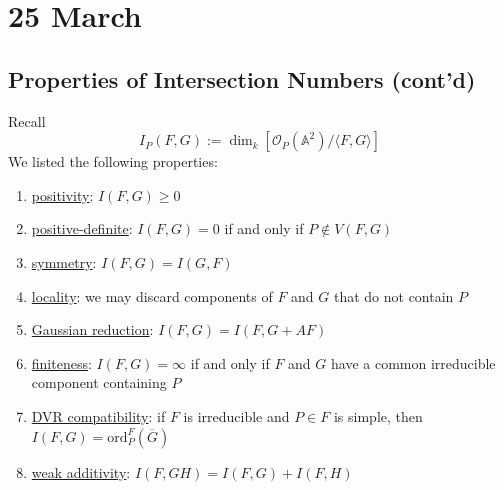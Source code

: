 \documentclass[12pt]{article}
\newcommand{\vbrack}[1]{\langle #1\rangle}
\theoremstyle{definition}
\begin{document}
\section{25 March}
\subsection{Properties of Intersection Numbers (cont'd)}
Recall 
\[I_P(F,G):=\dim_k\left[\mathcal{O}_P(\mathbb{A}^2)/\vbrack{F,G}\right]\]
We listed the following properties:
\begin{enumerate}
    \item \underline{positivity}: $I(F,G)\geq0$
    \item \underline{positive-definite}: $I(F,G)=0$ if and only if $P\notin V(F,G)$
    \item \underline{symmetry}: $I(F,G)=I(G,F)$
    \item \underline{locality}: we may discard components of $F$ and $G$ that do not contain $P$
    \item \underline{Gaussian reduction}: $I(F,G)=I(F,G+AF)$
    \item \underline{finiteness}: $I(F,G)=\infty$ if and only if $F$ and $G$ have a common irreducible component containing $P$
    \item \underline{DVR compatibility}: if $F$ is irreducible and $P\in F$ is simple, then $I(F,G)=\mathrm{ord}_P^F(\overline{G})$
    \item \underline{weak additivity}: $I(F,GH)=I(F,G)+I(F,H)$
    

\end{enumerate}
\end{document}
